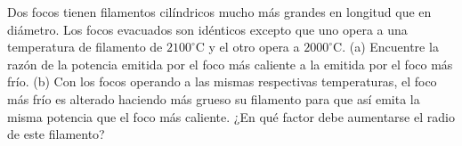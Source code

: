 \item Dos focos tienen filamentos cilíndricos mucho más grandes en longitud que en diámetro. Los focos evacuados son idénticos excepto que uno opera a una temperatura de filamento de $2100^\circ\text{C}$ y el otro opera a $2000^\circ\text{C}$. (a) Encuentre la razón de la potencia emitida por el foco más caliente a la emitida por el foco más frío. (b) Con los focos operando a las mismas respectivas temperaturas, el foco más frío es alterado haciendo más grueso su filamento para que así emita la misma potencia que el foco más caliente. ¿En qué factor debe aumentarse el radio de este filamento?
